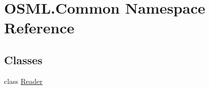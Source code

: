 \hypertarget{namespaceOSML_1_1Common}{}\section{O\+S\+M\+L.\+Common Namespace Reference}
\label{namespaceOSML_1_1Common}
\subsection*{Classes}
\begin{DoxyCompactItemize}
\item 
class \mbox{\hyperlink{classOSML_1_1Common_1_1Reader}{Reader}}
\end{DoxyCompactItemize}
